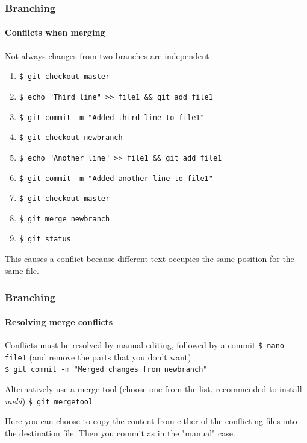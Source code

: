 \begin{frame}
\frametitle{Branching}
\framesubtitle{Conflicts when merging}

\begin{block}{Not always changes from two branches are independent}
\begin{enumerate}
\item \texttt{\$ git checkout master}\\
\item \texttt{\$ echo "Third line" >\;\!\!> file1 \&\& git add file1} \\
\item \texttt{\$ git commit -m "Added third line to file1"}\\
\item \texttt{\$ git checkout newbranch}\\
\item \texttt{\$ echo "Another line" >\;\!\!> file1 \&\& git add file1} \\
\item \texttt{\$ git commit -m "Added another line to file1"}\\
\item \texttt{\$ git checkout master}\\
\item \texttt{\$ git merge newbranch}\\
\item \texttt{\$ git status}
\end{enumerate}

This causes a conflict because different text occupies the same position for the same file.
\end{block}

\end{frame}

\begin{frame}
\frametitle{Branching}
\framesubtitle{Resolving merge conflicts}

\begin{block}{Conflicts must be resolved by manual editing, followed by a commit}
\texttt{\$ nano file1} (and remove the parts that you don't want)\\
\texttt{\$ git commit -m "Merged changes from newbranch"}\\
\end{block}
\pause
\begin{block}{Alternatively use a merge tool (choose one from the list, recommended to install {\em meld})}
\texttt{\$ git mergetool}

\medskip
Here you can choose to copy the content from either of the conflicting files into the destination file. Then you commit as in the "manual" case.
\end{block}

\end{frame}

